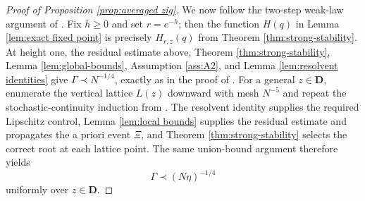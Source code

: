 \documentclass[11pt,reqno]{amsart}
\def\bD{\mathbf{D}}
\theoremstyle{definition}
\numberwithin{equation}{section}
\numberwithin{figure}{section}
\begin{document}
\begin{proof}[Proof of Proposition \ref{prop:averaged zig}]
We now follow the two-step weak-law argument of \cite[Lemmas~4.6 and~4.7]{fan2026anisotropic}. Fix $h\geq0$ and set $r=e^{-h}$; then the function $H(q)$ in Lemma \ref{lem:exact fixed point} is precisely $H_{r,z}(q)$ from Theorem \ref{thm:strong-stability}. At height one, the residual estimate above, Theorem \ref{thm:strong-stability}, Lemma \ref{lem:global-bounds}, Assumption \ref{ass:A2}, and Lemma \ref{lem:resolvent identities} give $\Gamma\prec N^{-1/4}$, exactly as in the proof of \cite[Lemma~4.6]{fan2026anisotropic}. For a general $z\in\bD$, enumerate the vertical lattice $L(z)$ downward with mesh $N^{-5}$ and repeat the stochastic-continuity induction from \cite[Lemma~4.7]{fan2026anisotropic}. The resolvent identity supplies the required Lipschitz control, Lemma \ref{lem:local bounds} supplies the residual estimate and propagates the a priori event $\Xi$, and Theorem \ref{thm:strong-stability} selects the correct root at each lattice point. The same union-bound argument therefore yields
\[
    \Gamma\prec (N\eta)^{-1/4}
\]
uniformly over $z\in\bD$.


\end{proof}
\end{document}
